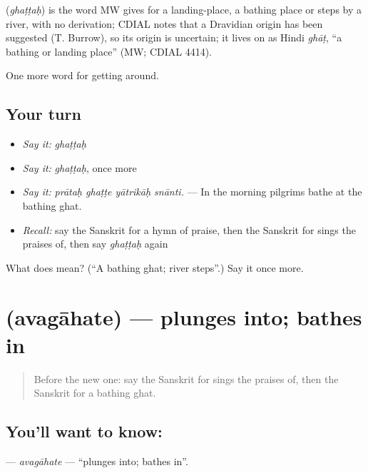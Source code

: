 \begin{cousinweb}
\textbf{} (\emph{ghaṭṭaḥ}) is the word MW gives for a landing-place, a bathing place or steps by a river, with no derivation; CDIAL notes that a Dravidian origin has been suggested (T. Burrow), so its origin is uncertain; it lives on as Hindi \emph{ghāṭ}, \textquotedblleft{}a bathing or landing place\textquotedblright{} (MW; CDIAL 4414).
\end{cousinweb}

\begin{grammarlens}[title={What you've built}]
One more word for getting around.
\end{grammarlens}

\subsection*{Your turn}
\begin{itemize}
\raggedright
  \item \emph{Say it:} \emph{ghaṭṭaḥ}
  \item \emph{Say it:} \emph{ghaṭṭaḥ}, once more
  \item \emph{Say it:} \emph{prātaḥ ghaṭṭe yātrikāḥ snānti.} — In the morning pilgrims bathe at the bathing ghat.
  \item \emph{Recall:} say the Sanskrit for a hymn of praise, then the Sanskrit for sings the praises of, then say \emph{ghaṭṭaḥ} again
\end{itemize}

\begin{tcolorbox}[breakable,colback=teal!4,colframe=teal!35!black,title={Before you move on}]
What does  mean? (\textquotedblleft{}A bathing ghat; river steps\textquotedblright{}.) Say it once more.
\end{tcolorbox}
\section[\texorpdfstring{\sk{अवगाहते} (avagāhate)}{अवगाहते (avagāhate)}]{ (avagāhate) — plunges into; bathes in}

\label{lesson:SA-C398-avagahate}



\begin{quote}
Before the new one: say the Sanskrit for sings the praises of, then the Sanskrit for a bathing ghat.
\end{quote}

\subsection*{You'll want to know: }
\textbf{} — \emph{avagāhate} — \textquotedblleft{}plunges into; bathes in\textquotedblright{}.

